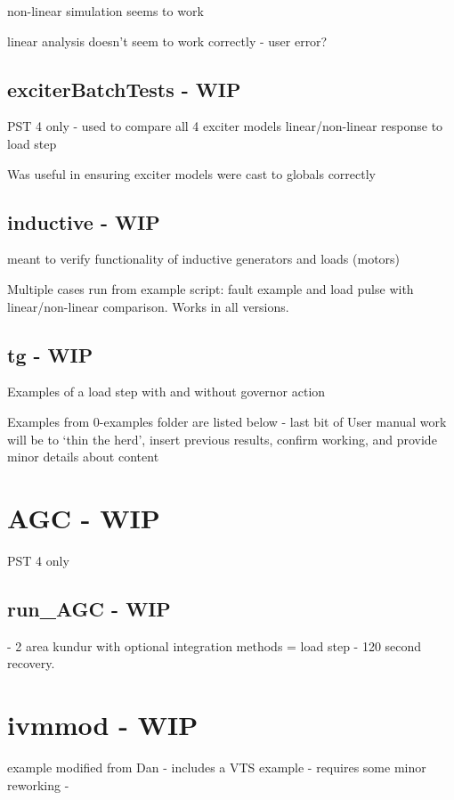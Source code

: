 non-linear simulation seems to work

linear analysis doesn't seem to work correctly - user error?

\subsection{exciterBatchTests - WIP}
PST 4 only - used to compare all 4 exciter models linear/non-linear response to load step

Was useful in ensuring exciter models were cast to globals correctly

\subsection{inductive - WIP}
meant to verify functionality of inductive generators and loads (motors)

Multiple cases run from example script: fault example and load pulse with linear/non-linear comparison.
Works in all versions.

\subsection{tg - WIP}
Examples of a load step with and without governor action

\pagebreak
Examples from 0-examples folder are listed below - last bit of User manual work will be to `thin the herd', insert previous results, confirm working, and provide minor details about content


\section{AGC - WIP}
PST 4 only

\subsection{run\_AGC - WIP}
- 2 area kundur with optional integration methods = load step - 120 second recovery.






\pagebreak



\pagebreak
\section{ivmmod - WIP} \label{sec: ivmmod ex}
example modified from Dan - includes a VTS example  -
requires some minor reworking - 

